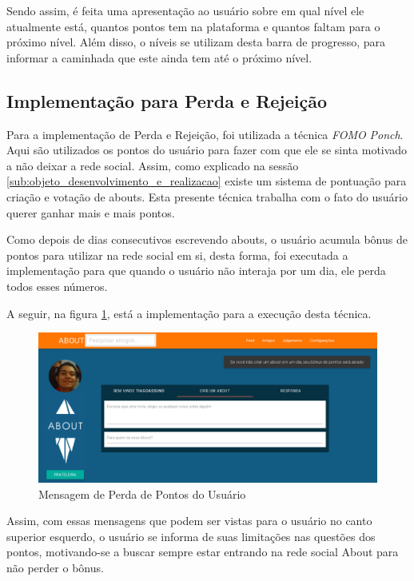 Sendo assim, é feita uma apresentação ao usuário sobre em qual nível ele atualmente está, quantos
pontos tem na plataforma e quantos faltam para o próximo nível.
Além disso, o níveis se utilizam desta barra de progresso, para informar a caminhada que este ainda
tem até o próximo nível.

\subsection{Implementação para Perda e Rejeição}
\label{sub:implementacao_perda_rejeicao}
Para a implementação de Perda e Rejeição, foi utilizada a técnica \textit{FOMO} \textit{Ponch}. Aqui são utilizados os pontos
do usuário para fazer com que ele se sinta motivado a não deixar a rede social. Assim, como explicado na
sessão \ref{sub:objeto_desenvolvimento_e_realizacao}
existe um sistema de pontuação para criação e votação de abouts. Esta presente técnica trabalha com o fato
do usuário querer ganhar mais e mais pontos.

Como depois de dias consecutivos escrevendo abouts, o usuário acumula bônus de pontos para utilizar na rede
social em si, desta forma, foi executada a implementação para que quando o usuário não interaja por um dia, ele
perda todos esses números.

A seguir, na figura \ref{fig:mensagem_perda}, está a implementação para a execução desta técnica.

\begin{figure}[h]
    \centering
    \includegraphics[width=450px, scale=1]{figuras/mensagem_perda}
    \caption{Mensagem de Perda de Pontos do Usuário}
    \label{fig:mensagem_perda}
\end{figure}

Assim, com essas mensagens que podem ser vistas para o usuário no canto superior esquerdo,
o usuário se informa de suas limitações nas questões dos pontos, motivando-se a buscar
sempre estar entrando na rede social About para não perder o bônus.
